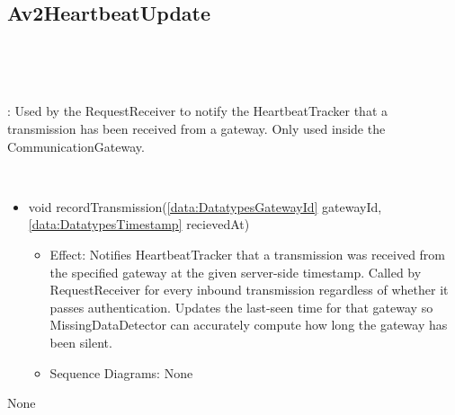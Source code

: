   \subsection{Av2HeartbeatUpdate}\label{int:InterfacesAv2HeartbeatUpdate}
    \begin{description}
      \item[Provided by:] \iconcomponent{}~
      \item[Required by:] \iconcomponent{}~ 
           \item[Description]: Used by the RequestReceiver to notify the HeartbeatTracker that a transmission has been received from a gateway. Only used inside the CommunicationGateway.
      \item[Operations:] ~
    \begin{itemize}[noitemsep,nolistsep,leftmargin=-.25cm]
      \item \textsf{void recordTransmission(\ref{data:DatatypesGatewayId} gatewayId, \ref{data:DatatypesTimestamp} recievedAt)}
        \begin{itemize}[noitemsep,nolistsep]
           \item Effect: Notifies HeartbeatTracker that a transmission was received from the specified gateway at the given server-side timestamp. Called by RequestReceiver for every inbound transmission regardless of whether it passes authentication. Updates the last-seen time for that gateway so MissingDataDetector can accurately compute how long the gateway has been silent. 
           \item Sequence Diagrams: None
        \end{itemize}
    \end{itemize}
      \item[Diagrams:] None
    \end{description}

